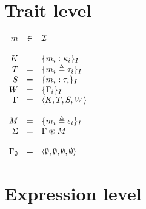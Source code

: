 \documentclass{article}[11pt]
\begin{document}
    \section{Trait level}\label{sec:trait-level}

    \begin{math}
        \begin{array}{rclp{5cm}}
            m                & \in & {\cal I}                                                   \\
            \\
            K       & =   & \{ m_i : \kappa_i \}_I            \\
            T       & =   & \{ m_i \triangleq \tau_i \}_I     \\
            S       & =   & \{ m_i : \tau_i \}_I              \\
            W       & =   & \{ \Gamma_i \}_I                  \\
            \Gamma  & =   & \langle K, T, S, W \rangle        \\
            \\
            M       & =   & \{ m_i \triangleq \epsilon_i \}_I \\
            \Sigma  & =   & \Gamma \circledast M               \\
            \\
            \Gamma_\emptyset & =& \langle \emptyset, \emptyset, \emptyset, \emptyset \rangle
        \end{array}
    \end{math}


    \section{Expression level}\label{sec:expression-level}
\end{document}
